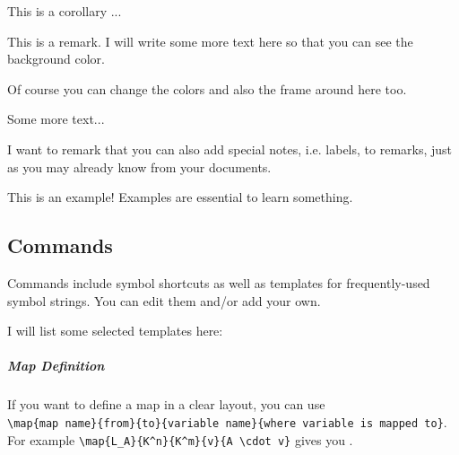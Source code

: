 \documentclass[11pt, a4paper]{article}
\begin{document}
\begin{corollary}
	This is a corollary ...
\end{corollary}

\begin{remark}
	This is a remark. I will write some more text here so that you can see the background color.
	
	Of course you can change the colors and also the frame around here too.
	
	Some more text...
\end{remark}

\begin{remark}[to remarks]
	I want to remark that you can also add special notes, i.e. labels, to remarks, just as you may already know from your documents.
\end{remark}

\begin{example}
	This is an example! Examples are essential to learn something.
\end{example}

\subsection{Commands}

Commands include symbol shortcuts as well as templates for frequently-used symbol strings. You can edit them and/or add your own.

I will list some selected templates here:

\subparagraph{Map Definition}

If you want to define a map in a clear layout, you can use \\
\verb|\map{map name}{from}{to}{variable name}{where variable is mapped to}|. \\
For example \verb|\map{L_A}{K^n}{K^m}{v}{A \cdot v}| gives you 
.
\end{document}
